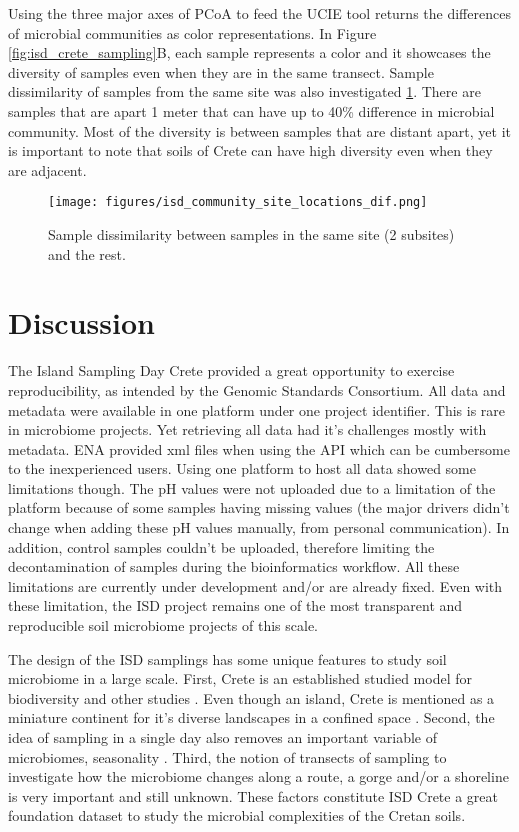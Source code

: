 Using the three major axes of PCoA to feed the UCIE tool \parencite{Koutrouli2022} returns the differences 
of microbial communities as color representations. In Figure \ref{fig:isd_crete_sampling}B, each 
sample represents a color and it showcases the diversity of samples even when they are 
in the same transect. Sample dissimilarity of samples from the same site was also investigated \ref{fig:isd_site_locations}.
There are samples that are apart 1 meter that can have up to 40\% difference in
microbial community. Most of the diversity is between samples that are distant apart,
yet it is important to note that soils of Crete can have high diversity even when they 
are adjacent. 

\begin{figure}[hbt!] 
    \centering\texttt{[image: figures/isd\_community\_site\_locations\_dif.png]}
\caption{Sample dissimilarity between samples in the same site (2 subsites) and the rest.}
    \label{fig:isd_site_locations}
\end{figure}


\section{Discussion}\label{isd_discussion}

The Island Sampling Day Crete provided a great opportunity to 
exercise reproducibility, as intended by the Genomic Standards Consortium.
All data and metadata were available in one platform
under one project identifier. This is rare in microbiome projects. Yet retrieving
all data had it's challenges mostly with metadata. ENA provided xml files when 
using the API which can be cumbersome to the inexperienced users. 
Using one platform to host all data showed some limitations though. The pH values
were not uploaded due to a limitation of the platform because of some samples 
having missing values (the major drivers didn't change when adding these pH values manually, from personal communication).
In addition, control samples couldn't be uploaded,
therefore limiting the decontamination of samples during the bioinformatics workflow.
All these limitations are currently under development and/or are already fixed. 
Even with these limitation, the ISD project remains one of the most transparent
and reproducible soil microbiome projects of this scale.

The design of the ISD samplings has some unique features to study soil microbiome 
in a large scale. First, Crete is an established studied model for biodiversity and 
other studies \parencite{Vogiatzakis2008_crete}. Even though an island,
Crete is mentioned as a miniature continent for it's diverse landscapes in a 
confined space \parencite{Vogiatzakis_land_2017}. Second, the idea of sampling in a single day 
also removes an important variable of microbiomes, seasonality \parencite{Chase2021}.
Third, the notion of transects of sampling to investigate how the microbiome changes
along a route, a gorge and/or a shoreline is very important and still unknown.
These factors constitute ISD Crete a great foundation dataset to study the microbial complexities
of the Cretan soils.

